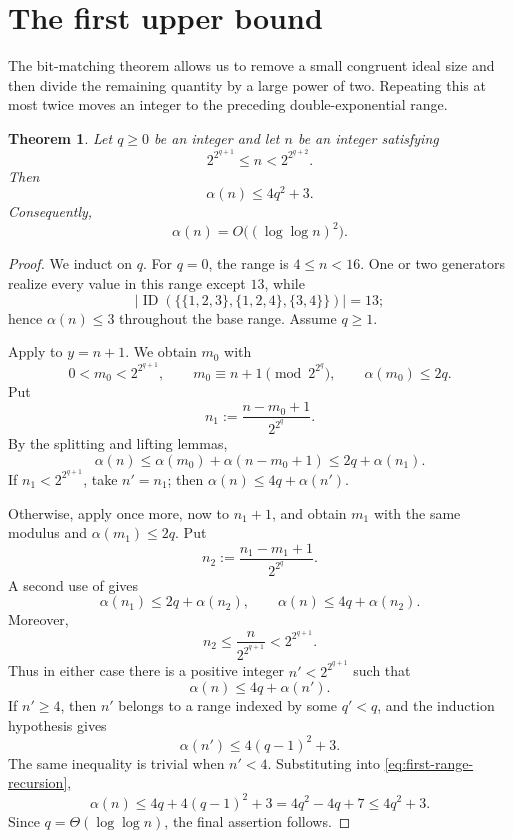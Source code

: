 \documentclass[11pt]{article}
\newtheorem{theorem}{Theorem}[section]
\theoremstyle{definition}
\theoremstyle{remark}
\newcommand{\ID}{\operatorname{ID}}
\begin{document}
\section{The first upper bound}\label{sec:first-range-reduction}

The bit-matching theorem allows us to remove a small congruent ideal size and
then divide the remaining quantity by a large power of two. Repeating this
at most twice moves an integer to the preceding double-exponential range.

\begin{theorem}\label{thm:first-upper}
Let $q\ge0$ be an integer and let $n$ be an integer satisfying
\[
  2^{2^{q+1}}\le n<2^{2^{q+2}}.
\]
Then
\[
  \alpha(n)\le4q^2+3.
\]
Consequently,
\[
  \alpha(n)=O\bigl((\log\log n)^2\bigr).
\]
\end{theorem}

\begin{proof}
We induct on $q$. For $q=0$, the range is $4\le n<16$. One or two generators realize every value in this range except $13$, while
\[
  |\ID(\{\{1,2,3\},\{1,2,4\},\{3,4\}\})|=13;
\]
hence $\alpha(n)\le3$ throughout the base range. Assume $q\ge1$.

Apply  to $y=n+1$. We obtain $m_0$ with
\[
  0<m_0<2^{2^{q+1}},
  \qquad
  m_0\equiv n+1\pmod{2^{2^q}},
  \qquad
  \alpha(m_0)\le2q.
\]
Put
\[
  n_1:=\frac{n-m_0+1}{2^{2^q}}.
\]
By the splitting and lifting lemmas,
\begin{equation}
  \alpha(n)
  \le\alpha(m_0)+\alpha(n-m_0+1)
  \le2q+\alpha(n_1).
  \label{eq:first-reduction-one-step}
\end{equation}
If $n_1<2^{2^{q+1}}$, take $n'=n_1$; then
$\alpha(n)\le4q+\alpha(n')$.

Otherwise, apply  once more, now to $n_1+1$, and
obtain $m_1$ with the same modulus and $\alpha(m_1)\le2q$. Put
\[
  n_2:=\frac{n_1-m_1+1}{2^{2^q}}.
\]
A second use of  gives
\[
  \alpha(n_1)\le2q+\alpha(n_2),
  \qquad
  \alpha(n)\le4q+\alpha(n_2).
\]
Moreover,
\[
  n_2\le\frac{n}{2^{2^{q+1}}}<2^{2^{q+1}}.
\]
Thus in either case there is a positive integer $n'<2^{2^{q+1}}$ such that
\begin{equation}
  \alpha(n)\le4q+\alpha(n').
  \label{eq:first-range-recursion}
\end{equation}
If $n'\ge4$, then $n'$ belongs to a range indexed by some $q'<q$, and the
induction hypothesis gives
\[
  \alpha(n')\le4(q-1)^2+3.
\]
The same inequality is trivial when $n'<4$. Substituting into
\eqref{eq:first-range-recursion},
\[
  \alpha(n)
  \le4q+4(q-1)^2+3
  =4q^2-4q+7
  \le4q^2+3.
\]
Since $q=\Theta(\log\log n)$, the final assertion follows.
\end{proof}
\end{document}
